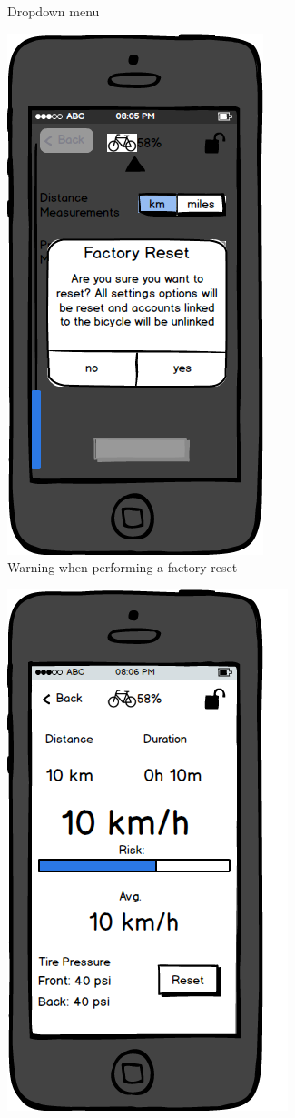 \documentclass[a4paper]{report}
\begin{document}
{\begin{figure}
\caption{Dropdown menu}
\end{figure}
\clearpage
\begin{figure}
\centering
\includegraphics[scale=0.9]{figures/prototype_2/factory_reset}
\caption{Warning when performing a factory reset}
\end{figure}
\clearpage
\begin{figure}
\centering
\includegraphics[scale=0.9]{figures/prototype_2/performance}

\end{figure}}
\end{document}
